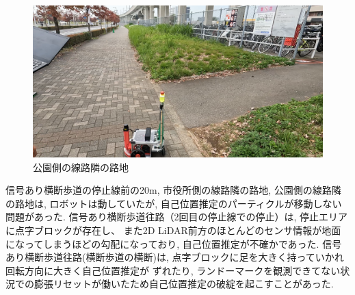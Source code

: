 \documentclass[twocolumn,9pt]{jsproceedings}
\begin{document}
\begin{figure}[h]
  \begin{center}
    \includegraphics[width=1.0\linewidth]{figs/park_side_alley.pdf}
    \caption{公園側の線路隣の路地}
    \label{fig:park_side_alley}
  \end{center}
\end{figure}




信号あり横断歩道の停止線前の20m, 市役所側の線路隣の路地, 公園側の線路隣の路地は, 
ロボットは動していたが, 自己位置推定のパーティクルが移動しない問題があった. 
信号あり横断歩道往路（2回目の停止線での停止）は, 停止エリアに点字ブロックが存在し、
また2D LiDAR前方のほとんどのセンサ情報が地面になってしまうほどの勾配になっており, 自己位置推定が不確かであった.
信号あり横断歩道往路(横断歩道の横断)は, 点字ブロックに足を大きく持っていかれ回転方向に大きく自己位置推定が
ずれたり, ランドーマークを観測できてない状況での膨張リセットが働いたため自己位置推定の破綻を起こすことがあった. 
\end{document}
